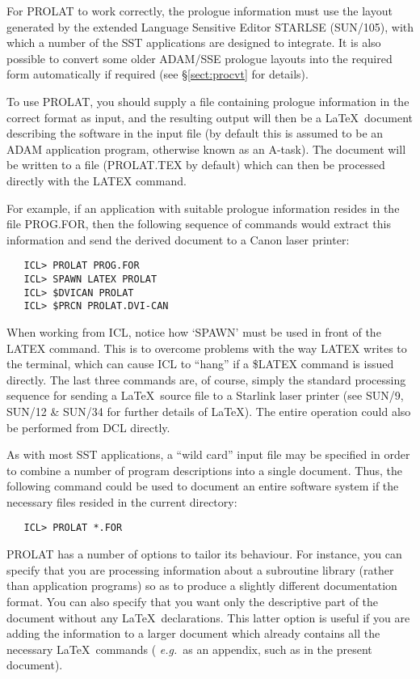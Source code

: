 For PROLAT to work correctly, the prologue information must use the layout
generated by the extended Language Sensitive Editor STARLSE (SUN/105), with
which a number of the SST applications are designed to integrate.
It is also possible to convert some older ADAM/SSE prologue layouts into the
required form automatically if required (see \S\ref{sect:procvt} for
details).

To use PROLAT, you should supply a file containing prologue information in
the correct format as input, and the resulting output will then be a \LaTeX\
document describing the software in the input file (by default this is
assumed to be an ADAM application program, otherwise known as an A-task).
The document will be written to a file (PROLAT.TEX by default) which can
then be processed directly with the LATEX command.

For example, if an application with suitable prologue information resides in
the file PROG.FOR, then the following sequence of commands would extract this
information and send the derived document to a Canon laser printer:

\begin{verbatim}
   ICL> PROLAT PROG.FOR
   ICL> SPAWN LATEX PROLAT
   ICL> $DVICAN PROLAT
   ICL> $PRCN PROLAT.DVI-CAN
\end{verbatim}

When working from ICL, notice how `SPAWN' must be used in front of the LATEX
command.
This is to overcome problems with the way LATEX writes to the terminal, which
can cause ICL to ``hang'' if a \$LATEX command is issued directly.
The last three commands are, of course, simply the standard processing
sequence for sending a \LaTeX\ source file to a Starlink laser printer (see
SUN/9, SUN/12 \& SUN/34 for further details of \LaTeX).
The entire operation could also be performed from DCL directly.

As with most SST applications, a ``wild card'' input file may be specified
in order to combine a number of program descriptions into a single document.
Thus, the following command could be used to document an entire software
system if the necessary files resided in the current directory:

\begin{verbatim}
   ICL> PROLAT *.FOR
\end{verbatim}

PROLAT has a number of options to tailor its behaviour.
For instance, you can specify that you are processing information about a
subroutine library (rather than application programs) so as to produce a
slightly different documentation format.
You can also specify that you want only the descriptive part of the document
without any \LaTeX\ declarations.
This latter option is useful if you are adding the information to a larger
document which already contains all the necessary \LaTeX\ commands ({\em
e.g.}\ as an appendix, such as in the present document).

